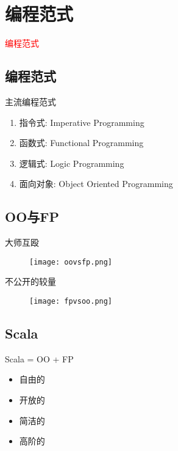 \section{编程范式}
\label{sec:paragigms}

\begin{frame}
  \begin{center}
    \Huge{\textcolor{red}{编程范式}}
  \end{center}
\end{frame}

\subsection{编程范式}

\begin{frame}{主流编程范式}
    \begin{enumerate}
    \item \alert{指令式}: Imperative Programming
    \item \alert{函数式}: Functional Programming
    \item \alert{逻辑式}: Logic Programming
    \item \alert{面向对象}: Object Oriented Programming
    \end{enumerate}
\end{frame}

\subsection{OO与FP}

\begin{frame}{大师互殴}
  \begin{figure}
    \centering
    \texttt{[image: oovsfp.png]}
  \end{figure}
\end{frame}

\begin{frame}{不公开的较量}
  \begin{figure}
    \centering
    \texttt{[image: fpvsoo.png]}
  \end{figure}
\end{frame}

\subsection{Scala}

\begin{frame}{Scala = OO + FP}
    \begin{itemize}
    \item \alert{自由的}
    \item \alert{开放的}
    \item \alert{简洁的}    
    \item \alert{高阶的}
    \end{itemize}
\end{frame}
